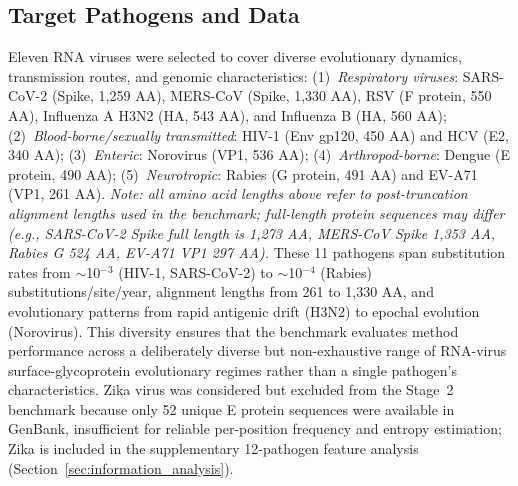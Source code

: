 \subsection{Target Pathogens and Data}
\label{subsec:9pathogen_data}

Eleven RNA viruses were selected to cover diverse evolutionary dynamics, transmission routes, and genomic characteristics:
(1)~\textit{Respiratory viruses}: SARS-CoV-2 (Spike, 1,259 AA), MERS-CoV (Spike, 1,330 AA), RSV (F protein, 550 AA), Influenza A H3N2 (HA, 543 AA), and Influenza B (HA, 560 AA);
(2)~\textit{Blood-borne/sexually transmitted}: HIV-1 (Env gp120, 450 AA) and HCV (E2, 340 AA);
(3)~\textit{Enteric}: Norovirus (VP1, 536 AA);
(4)~\textit{Arthropod-borne}: Dengue (E protein, 490 AA);
(5)~\textit{Neurotropic}: Rabies (G protein, 491 AA) and EV-A71 (VP1, 261 AA).
\textit{Note: all amino acid lengths above refer to post-truncation alignment lengths used in the benchmark; full-length protein sequences may differ (e.g., SARS-CoV-2 Spike full length is 1{,}273 AA, MERS-CoV Spike 1{,}353 AA, Rabies G 524 AA, EV-A71 VP1 297 AA).}
These 11 pathogens span substitution rates from $\sim$10$^{-3}$ (HIV-1, SARS-CoV-2) to $\sim$10$^{-4}$ (Rabies) substitutions/site/year, alignment lengths from 261 to 1,330 AA, and evolutionary patterns from rapid antigenic drift (H3N2) to epochal evolution (Norovirus).
This diversity ensures that the benchmark evaluates method performance across a deliberately diverse but non-exhaustive range of RNA-virus surface-glycoprotein evolutionary regimes rather than a single pathogen's characteristics.
Zika virus was considered but excluded from the Stage~2 benchmark because only 52 unique E protein sequences were available in GenBank, insufficient for reliable per-position frequency and entropy estimation; Zika is included in the supplementary 12-pathogen feature analysis (Section~\ref{sec:information_analysis}).

